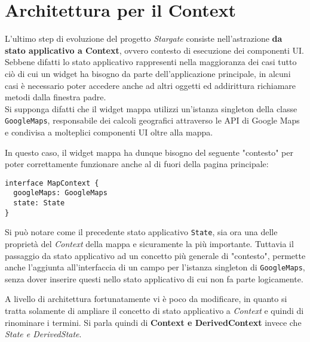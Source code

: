 
\chapter{Architettura per il Context}
\label{cap:architettura-context}

L'ultimo step di evoluzione del progetto \textit{Stargate} consiste nell'astrazione \textbf{da stato applicativo a Context}, ovvero contesto di esecuzione dei componenti UI. Sebbene difatti lo stato applicativo rappresenti nella maggioranza dei casi tutto ciò di cui un widget ha bisogno da parte dell'applicazione principale, in alcuni casi è necessario poter accedere anche ad altri oggetti ed addirittura richiamare metodi dalla finestra padre. \\

Si supponga difatti che il widget mappa utilizzi un'istanza \gls{singleton} della classe \texttt{GoogleMaps}, responsabile dei calcoli geografici attraverso le API di Google Maps e condivisa a molteplici componenti UI oltre alla mappa.

In questo caso, il widget mappa ha dunque bisogno del seguente "contesto" per poter correttamente funzionare anche al di fuori della pagina principale: \\

\begin{lstlisting}[language={[Sharp]C}]
interface MapContext {
  googleMaps: GoogleMaps
  state: State
}
\end{lstlisting}

Si può notare come il precedente stato applicativo \texttt{State}, sia ora una delle proprietà del \textit{Context} della mappa e sicuramente la più importante. Tuttavia il passaggio da stato applicativo ad un concetto più generale di "contesto", permette anche l'aggiunta all'interfaccia di un campo per l'istanza singleton di \texttt{GoogleMaps}, senza dover inserire questi nello stato applicativo di cui non fa parte logicamente. 

A livello di architettura fortunatamente vi è poco da modificare, in quanto si tratta solamente di ampliare il concetto di stato applicativo a \textit{Context} e quindi di rinominare i termini. Si parla quindi di \textbf{Context e DerivedContext} invece che \textit{State e DerivedState}.

